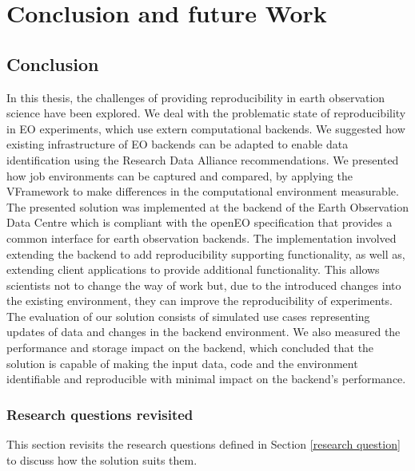 \documentclass[draft,final]{vutinfth} %
\begin{document}
\chapter{Conclusion and future Work}\label{Conclusion}

\section{Conclusion}

In this thesis, the challenges of providing reproducibility in earth observation science have been explored. We deal with the problematic state of reproducibility in EO experiments, which use extern computational backends. We suggested how existing infrastructure of EO backends can be adapted to enable data identification using the Research Data Alliance recommendations. We presented how job environments can be captured and compared, by applying the VFramework to make differences in the computational environment measurable. The presented solution was implemented at the backend of the Earth Observation Data Centre which is compliant with the openEO specification that provides a common interface for earth observation backends. The implementation involved extending the backend to add reproducibility supporting functionality, as well as, extending client applications to provide additional functionality. This allows scientists not to change the way of work but, due to the introduced changes into the existing environment, they can improve the reproducibility of experiments. The evaluation of our solution consists of simulated use cases representing updates of data and changes in the backend environment. We also measured the performance and storage impact on the backend, which concluded that the solution is capable of making the input data, code and the environment identifiable and reproducible with minimal impact on the backend's performance.       

\subsection{Research questions revisited}\label{research question revisited}
This section revisits the research questions defined in Section \ref{research question} to discuss how the solution suits them.
\end{document}
